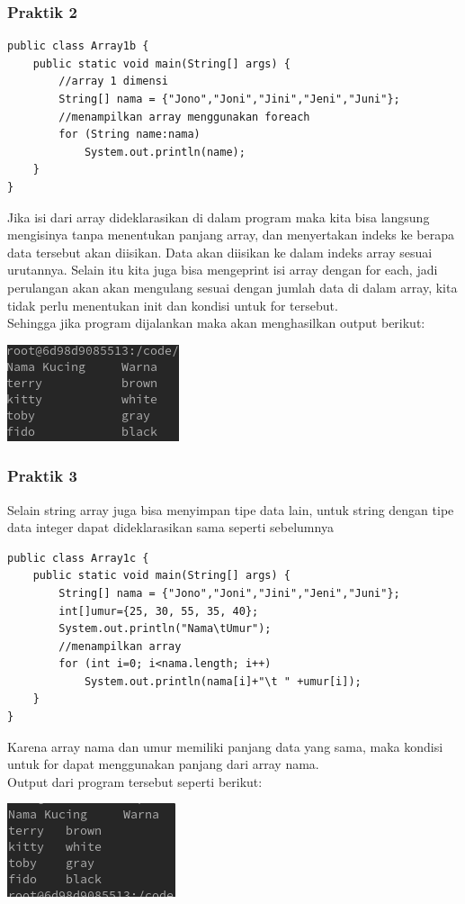 \documentclass[a4paper,12pt]{article}
\begin{document}
\subsubsection{Praktik 2}
\begin{lstlisting}
public class Array1b {
    public static void main(String[] args) {
        //array 1 dimensi
        String[] nama = {"Jono","Joni","Jini","Jeni","Juni"};
        //menampilkan array menggunakan foreach
        for (String name:nama)
            System.out.println(name);
    }
}
\end{lstlisting}
Jika isi dari array dideklarasikan di dalam program maka kita bisa langsung mengisinya tanpa menentukan panjang array, dan menyertakan indeks ke berapa data tersebut akan diisikan. 
Data akan diisikan ke dalam indeks array sesuai urutannya.
Selain itu kita juga bisa mengeprint isi array dengan for each, jadi perulangan akan akan mengulang sesuai dengan jumlah data di dalam array, kita tidak perlu menentukan init dan kondisi 
untuk for tersebut.\\
Sehingga jika program dijalankan maka akan menghasilkan output berikut:\\
\begin{center}
    \includegraphics[scale=.7]{1.png}
\end{center}

\subsubsection{Praktik 3}
Selain string array juga bisa menyimpan tipe data lain, untuk string dengan tipe data integer dapat dideklarasikan sama seperti sebelumnya
\begin{lstlisting}
public class Array1c {
    public static void main(String[] args) {
        String[] nama = {"Jono","Joni","Jini","Jeni","Juni"};
        int[]umur={25, 30, 55, 35, 40};
        System.out.println("Nama\tUmur");
        //menampilkan array
        for (int i=0; i<nama.length; i++)
            System.out.println(nama[i]+"\t " +umur[i]);
    }
}
\end{lstlisting}
Karena array nama dan umur memiliki panjang data yang sama, maka kondisi untuk for dapat menggunakan panjang dari array nama.\\
Output dari program tersebut seperti berikut:\\
\begin{center}
    \includegraphics[scale=.7]{2.png}
\end{center}
\end{document}
